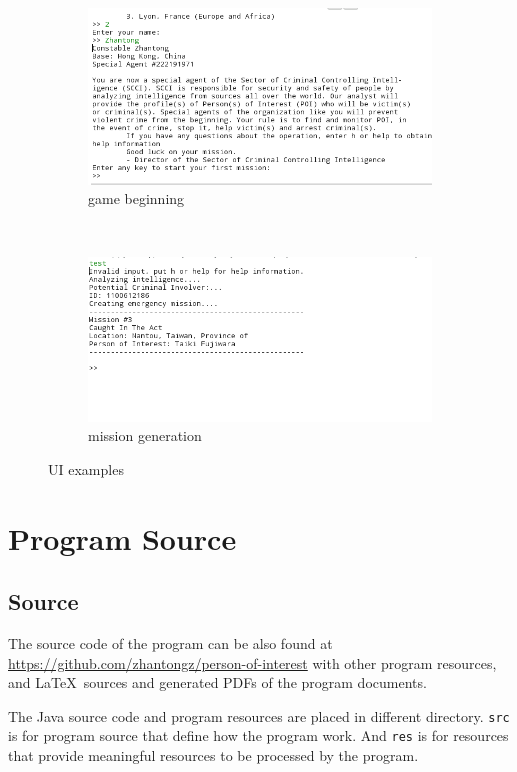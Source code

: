 \documentclass[letterpaper, 11pt]{report}
\begin{document}
\begin{figure}[h]
\begin{subfigure}[b]{0.4\textwidth}
\includegraphics[width=\linewidth]{./img/ui3}
\caption{game beginning}
\end{subfigure}
~
\begin{subfigure}[b]{0.4\textwidth}
\includegraphics[width=\linewidth]{./img/ui4}
\caption{mission generation}
\end{subfigure}
\caption{UI examples}
\end{figure}

\part{Program Source}
\lstset{language=Java, numbers=left, breaklines=true, showstringspaces=false,
basicstyle=\footnotesize\ttfamily, tabsize=2,keywordstyle=\bfseries}
\chapter{Source}
The source code of the program can be also found at
\url{https://github.com/zhantongz/person-of-interest} with other program
resources, and \LaTeX\ sources and generated PDFs of the program documents.

The Java source code and program resources are placed in different directory.
\texttt{src} is for program source that define how the program work. And
\texttt{res} is for resources that provide meaningful resources to be processed
by the program.
\end{document}
